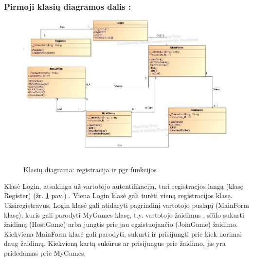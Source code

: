 \documentclass{VUMIFPSkursinis}
\begin{document}
		\subsubsection*{Pirmoji klasių diagramos dalis :}
			\begin{figure}[H]
				\centering
				\includegraphics[scale=0.5]{img/BoardGamesClassDiagram}
				\caption{Klasių diagrama: registracija ir pgr funkcijos}
				\label{img:BoardGamesClassDiagram}
			\end{figure}
			Klasė Login, atsakinga už vartotojo autentifikaciją, turi  registracjos langą (klasę Register) (žr. \ref{img:BoardGamesClassDiagram} pav.) . Viena Login klasė gali turėti vieną   registracijos klasę. Užsiregistravus, Login klasė gali atidaryti pagrindinį vartotojo puslapį (MainForm klasę), kuris gali parodyti MyGames klasę, t.y. vartotojo žaidimus , siūlo sukurti žaidimą (HostGame) arba jungtis prie jau egzistuojančio (JoinGame) žaidimo. Kiekviena MainForm klasė gali parodyti, sukurti ir prisijungti prie kiek norimai daug žaidimų. Kiekvieną kartą sukūrus ar prisijungus prie žaidimo, jis yra pridedamas prie MyGames. 
\end{document}
